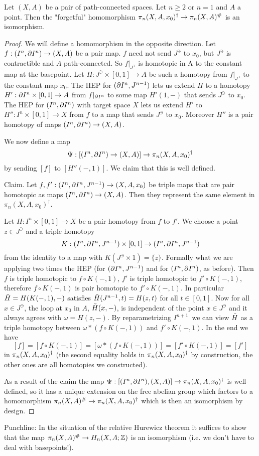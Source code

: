 \begin{proposition}
Let $(X,A)$ be a pair of path-connected spaces. Let $n\geq2$ or $n=1$ and $A$ a point. Then the "forgetful" homomorphism $\pi_n(X,A,x_0)^\dagger\to\pi_n(X,A)^\#$ is an isomorphism.
\end{proposition}

\begin{proof}
We will define a homomorphism in the opposite direction. Let $f:(I^n,\partial I^n)\to (X,A)$ be a pair map. $f$ need not send $J^\ni$ to $x_0$, but $J^\ni$ is contractible and $A$ path-connected. So $f|_{J^\ni}$ is homotopic in A to the constant map at the basepoint. Let $H:J^\ni\times[0,1]\to A$ be such a homotopy from $f|_{J^\ni}$ to the constant map $x_0$. The HEP for $(\partial I^n,J^{n-1})$ lets us extend $H$ to a homotopy $H':\partial I^n\times[0,1]\to A$ from $f|_{\partial I^n}$ to some map $H'(1,-)$ that sends $J^\ni$ to $x_0$. The HEP for $(I^n,\partial I^n)$ with target space $X$ lets us extend $H'$ to $H'':I^n\times[0,1]\to X$ from $f$ to a map that sends $J^\ni$ to $x_0$. Moreover $H''$ is a pair homotopy of maps $(I^n,\partial I^n)\to (X,A)$.

We now define a map \[\Psi:[(I^n,\partial I^n)\to (X,A)]\to \pi_n(X,A,x_0)^\dagger\]
by sending $[f]$ to $[H''(-,1)]$. We claim that this is well defined.
 
Claim. Let $f,f':(I^n,\partial I^n, J^{n-1})\to(X,A,x_0)$ be triple maps that are pair homotopic as maps $(I^n,\partial I^n)\to (X,A)$. Then they represent the same element in $\pi_n(X,A,x_0)^\dagger$.

\begin{claimproof}
Let $H:I^n\times[0,1]\to X$ be a pair homotopy from $f$ to $f'$. We choose a point $z\in J^\ni$ and a triple homotopy
\[K:(I^n,\partial I^n,J^{n-1})\times[0,1]\to(I^n,\partial I^n,J^{n-1})\]
from the identity to a map with $K(J^\ni\times 1)=\{z\}$. Formally what we are applying two times the HEP (for $(\partial I^n,J^{n-1})$ and for $(I^n,\partial I^n)$, as before). Then $f$ is triple homotopic to $f\circ K(-,1)$, $f'$ is triple homotopic to $f'\circ K(-,1)$, therefore $f\circ K(-,1)$ is pair homotopic to $f'\circ K(-,1)$. In particular $\tilde{H}=H(K(-,1),-)$ satisfies $\tilde{H}(J^{n-1},t)=H(z,t)$ for all $t\in [0,1]$. Now for all $x\in J^\ni$, the loop at $x_0$ in $A$, $\tilde{H}(x,-)$, is independent of the point $x\in J^\ni$ and it always agrees with $\omega=H(z,-)$. By reparametrizing $I^{n+1}$\alvaropls\ we can view $\tilde{H}$ as a triple homotopy between $\omega * (f\circ K(-,1))$ and $f'\circ K(-,1)$. In the end we have
\[[f]=[f\circ K(-,1)]=[\omega * (f\circ K(-,1))]=[f'\circ K(-,1)]=[f']\] in $\pi_n(X,A,x_0)^\dagger$ (the second equality holds in $\pi_n(X,A,x_0)^\dagger$ by construction, the other ones are all homotopies we constructed).
\end{claimproof}

As a result of the claim the map $\Psi:[(I^n,\partial I^n),(X,A)]\to\pi_n(X,A,x_0)^\dagger$ is well-defined, so it has a unique extension on the free abelian group which factors to a homomorphism $\pi_n(X,A)^\#\to\pi_n(X,A,x_0)^\dagger$ which is then an isomorphism by design.
\end{proof}
 
Punchline: In the situation of the relative Hurewicz theorem it suffices to show that the map $\pi_n(X,A)^\#\to H_n(X,A;{\mathbb Z})$ is an isomorphism (i.e. we don't have to deal with basepoints!).
